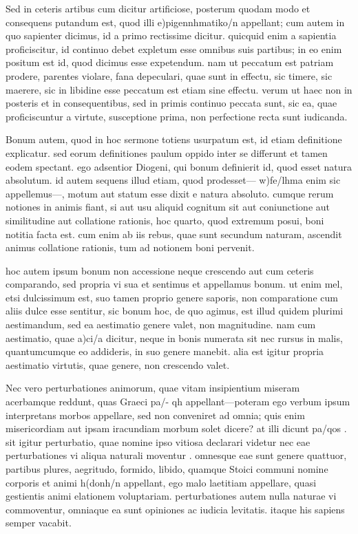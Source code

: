 Sed in ceteris artibus cum dicitur artificiose, posterum quodam modo et consequens putandum est, quod illi e)pigennhmatiko/n appellant; cum autem in quo sapienter dicimus, id a primo rectissime dicitur. quicquid enim a sapientia proficiscitur, id continuo debet expletum esse omnibus suis partibus; in eo enim positum est id, quod dicimus esse expetendum. nam ut peccatum est patriam prodere, parentes violare, fana depeculari, quae sunt in effectu, sic timere, sic maerere, sic in libidine esse peccatum est etiam sine effectu. verum ut haec non in posteris et in consequentibus, sed in primis continuo peccata sunt, sic ea, quae proficiscuntur a virtute, susceptione prima, non perfectione recta sunt iudicanda.

 Bonum autem, quod in hoc sermone totiens usurpatum est, id etiam definitione explicatur. sed eorum definitiones paulum oppido inter se differunt et tamen eodem spectant. ego adsentior Diogeni, qui bonum definierit id, quod esset natura absolutum. id autem sequens illud etiam, quod prodesset— w)fe/lhma enim sic appellemus—, motum aut statum esse dixit e natura absoluto. cumque rerum notiones in animis fiant, si aut usu aliquid cognitum sit aut coniunctione aut similitudine aut collatione rationis, hoc quarto, quod extremum posui, boni notitia facta est. cum enim ab iis rebus, quae sunt secundum naturam, ascendit animus collatione rationis, tum ad notionem boni pervenit.

 hoc autem ipsum bonum non accessione neque crescendo aut cum ceteris comparando, sed propria vi sua et sentimus et appellamus bonum. ut enim mel, etsi dulcissimum est, suo tamen proprio genere saporis, non comparatione cum aliis dulce esse sentitur, sic bonum hoc, de quo agimus, est illud quidem plurimi aestimandum, sed ea aestimatio genere valet, non magnitudine. nam cum aestimatio, quae a)ci/a dicitur, neque in bonis numerata sit nec rursus in malis, quantumcumque eo addideris, in suo genere manebit. alia est igitur propria aestimatio virtutis, quae genere, non crescendo valet.

 Nec vero perturbationes animorum, quae vitam insipientium miseram acerbamque reddunt, quas Graeci pa/- qh appellant—poteram ego verbum ipsum interpretans morbos appellare, sed non conveniret ad omnia; quis enim misericordiam aut ipsam iracundiam morbum solet dicere? at illi dicunt pa/qos . sit igitur perturbatio, quae nomine ipso vitiosa declarari videtur nec eae perturbationes vi aliqua naturali moventur . omnesque eae sunt genere quattuor, partibus plures, aegritudo, formido, libido, quamque Stoici communi nomine corporis et animi h(donh/n appellant, ego malo laetitiam appellare, quasi gestientis animi elationem voluptariam. perturbationes autem nulla naturae vi commoventur, omniaque ea sunt opiniones ac iudicia levitatis. itaque his sapiens semper vacabit.

